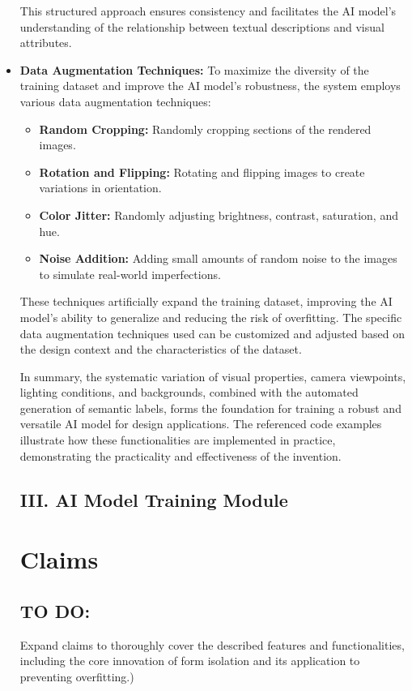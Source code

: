 \documentclass{article}
\begin{document}
\begin{itemize}
This structured approach ensures consistency and facilitates the AI model's understanding of the relationship between textual descriptions and visual attributes.

\item \textbf{Data Augmentation Techniques:} To maximize the diversity of the training dataset and improve the AI model's robustness, the system employs various data augmentation techniques:

\begin{itemize}
    \item \textbf{Random Cropping:} Randomly cropping sections of the rendered images.
    \item \textbf{Rotation and Flipping:} Rotating and flipping images to create variations in orientation.
    \item \textbf{Color Jitter:} Randomly adjusting brightness, contrast, saturation, and hue.
    \item \textbf{Noise Addition:} Adding small amounts of random noise to the images to simulate real-world imperfections.
\end{itemize}

These techniques artificially expand the training dataset, improving the AI model's ability to generalize and reducing the risk of overfitting. The specific data augmentation techniques used can be customized and adjusted based on the design context and the characteristics of the dataset.

In summary, the systematic variation of visual properties, camera viewpoints, lighting conditions, and backgrounds, combined with the automated generation of semantic labels, forms the foundation for training a robust and versatile AI model for design applications. The referenced code examples illustrate how these functionalities are implemented in practice, demonstrating the practicality and effectiveness of the invention.

\subsection{III. AI Model Training Module}
\section{Claims}

\subsection{TO DO:}
Expand claims to thoroughly cover the described features and functionalities, including the core innovation of form isolation and its application to preventing overfitting.)


\end{itemize}
\end{document}

